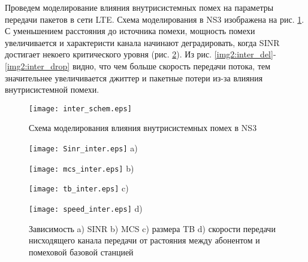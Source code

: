 Проведем моделирование влияния внутрисистемных помех на параметры передачи пакетов в сети LTE. Схема моделирования в NS3 изображена на рис. \ref{img:inter_schem}. С уменьшением расстояния до источника помехи, мощность помехи увеличивается и характеристи канала начинают деградировать, когда SINR достигает некоего критического уровня (рис. \ref{img:inter}).
Из рис. \ref{img2:inter_del}-\ref{img2:inter_drop} видно, что чем больше скорость передачи потока, тем значительнее увеличивается джиттер и пакетные потери из-за влияния внутрисистемной помехи.
\begin{figure} [!h]
  \center
\texttt{[image: inter\_schem.eps]}
  \caption{Схема моделирования влияния внутрисистемных помех в NS3}
  \label{img:inter_schem}
\end{figure}
\begin{figure} [!h]
\begin{minipage}[h]{0.47\linewidth}
\center
\texttt{[image: Sinr\_inter.eps]} a) \\
\end{minipage}
\hfill
\begin{minipage}[h]{0.47\linewidth}
\center
\texttt{[image: mcs\_inter.eps]} b) \\
\end{minipage}
\vfill
\begin{minipage}[h]{0.47\linewidth}
\center
\texttt{[image: tb\_inter.eps]} c) \\
\end{minipage}
\hfill
\begin{minipage}[h]{0.47\linewidth}
\center
\texttt{[image: speed\_inter.eps]} d) \\
\end{minipage}
\caption{Зависимость a) SINR b) MCS c) размера TB d) скорости передачи нисходящего канала передачи от растояния между абонентом и помеховой базовой станцией}
\label{img:inter}
\end{figure}

\clearpage

